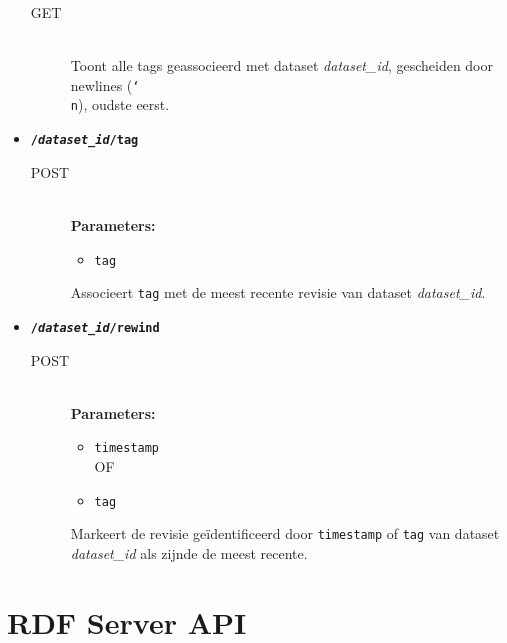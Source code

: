 \documentclass[a4paper]{article}
\begin{document}
\begin{itemize}
    \begin{description}
      \item[GET] \hfill \\
        Toont alle tags geassocieerd met dataset {\it dataset\_id}, gescheiden
        door newlines ({\tt \char`\\n}), oudste eerst.
    \end{description}
  \item {\tt\large\bf /{\it dataset\_id}/tag}
    \begin{description}
      \item[POST] \hfill \\
        {\bf Parameters:}
        \begin{itemize}
          \item {\tt tag}
        \end{itemize}
        Associeert {\tt tag} met de meest recente revisie van dataset
        {\it dataset\_id}.
    \end{description}
  \item {\tt\large\bf /{\it dataset\_id}/rewind}
    \begin{description}
      \item[POST] \hfill \\
        {\bf Parameters:}
        \begin{itemize}
          \item {\tt timestamp} \\
          OF
          \item {\tt tag}
        \end{itemize}
        Markeert de revisie ge\"identificeerd door {\tt timestamp} of {\tt tag}
        van dataset {\it dataset\_id} als zijnde de meest recente.
    \end{description}
\end{itemize}

\section{\gls{RDF} Server \gls{API}}
\label{app:rdf}
\end{document}
